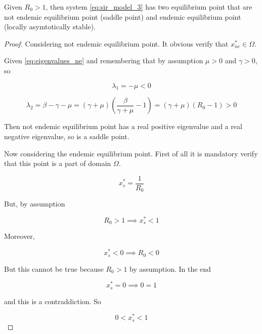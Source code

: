 \begin{theorem}
\label{th:R0_major_then_1_Equilibria}
Given $R_0 > 1$, then system \ref{eq:sir_model_3} has two equilibrium point that are not endemic equilibrium point (saddle point) and endemic equilibrium point (locally asymtotically stable).
\end{theorem}

\begin{proof}
Considering not endemic equilibrium point. It obvious verify that $x_{ne}^* \in \Omega$.

Given \ref{eq:eigenvalues_ne} and remembering that by assumption $\mu > 0$ and $\gamma > 0$, so

\begin{equation}
    \lambda_1 = -\mu < 0
\end{equation}

\begin{equation}
    \lambda_2 = \beta - \gamma - \mu = (\gamma + \mu)\left(\frac{\beta}{\gamma + \mu} - 1\right) = (\gamma + \mu)(R_0 - 1) > 0
\end{equation}

Then not endemic equilibrium point has a real positive eigenvalue and a real negative eigenvalue, so is a saddle point.

Now considering the endemic equilibrium point. First of all it is mandatory verify that this point is a part of domain $\Omega$.

\begin{equation}
    x_s^* = \frac{1}{R_0}
\end{equation}

But, by assumption

\begin{equation}
    R_0 > 1 \implies x_s^* < 1
\end{equation}

Moreover, 

\begin{equation}
    x_s^* < 0 \implies R_0 < 0  
\end{equation}

But this cannot be true because $R_0 > 1$ by assumption. In the end

\begin{equation}
    x_s^* = 0 \implies 0 = 1  
\end{equation}

and this is a contraddiction. So

\begin{equation}
    0 < x_s^* < 1
\end{equation}


\end{proof}

